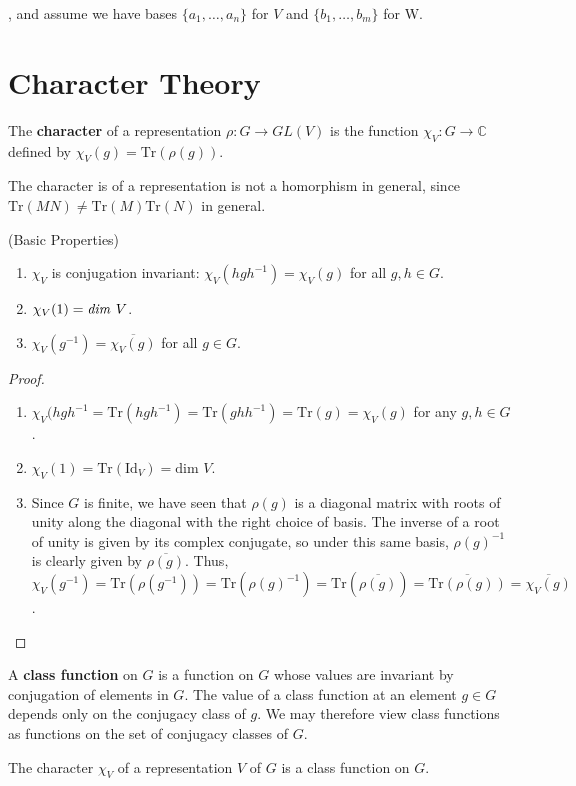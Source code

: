 , and assume we have bases $\{ a_1, \ldots, a_n\}$ for $V$  and $\{b_1, \ldots, b_m \}$ for W.


\section{Character Theory}
\begin{defn}
The \textbf{character} of a representation $\rho \colon G \to GL(V)$ is the function $\chi_V \colon G \to \mathbb{C}$ defined by $\chi_V(g) = \text{Tr}(\rho(g))$.
\end{defn}
\begin{note}
The character is of a representation is not a homorphism in general, since $\text{Tr}(MN) \neq \text{Tr}(M) \text{Tr}(N)$ in general.
\end{note}

\begin{prop} (Basic Properties)
\begin{enumerate}
\item $\chi_V$ is conjugation invariant: $\chi_V (h g h^{-1}) = \chi_V (g)$ for all $g , h \in G$.
\item $\chi_V (1) = \text{\emph{dim }} V$.
\item $\chi_V (g^{-1}) = \overline{\chi_V (g)}$ for all $g \in G$.
\end{enumerate}
\end{prop}

\begin{proof}
\begin{enumerate}
\item $\chi_V (h g h^{-1} = \text{Tr}(h g h^{-1}) = \text{Tr}(g h h^{-1}) = \text{Tr} (g) = \chi_V(g)$ for any $g,h \in G$.
\item $\chi_V(1) = \text{Tr}(\text{Id} _V) = \text{dim } V$.
\item Since $G$ is finite, we have seen that $\rho(g)$ is a diagonal matrix with roots of unity along the diagonal with the right choice of basis.  The inverse of a root of unity is given by its complex conjugate, so under this same basis, $\rho(g)^{-1}$ is clearly given by $\overline{\rho(g)}$.  Thus, $\chi_V(g^{-1}) = \text{Tr}(\rho(g^{-1})) = \text{Tr}(\rho(g)^{-1}) = \text{Tr}(\overline{\rho(g)}) = \overline{ \text{Tr} (\rho(g))} = \overline {\chi_V(g)}$.
\end{enumerate}
\end{proof}

\begin{defn}
A \textbf{class function} on $G$ is a function on $G$ whose values are invariant by conjugation of elements in $G$.  The value of a class function at an element $g \in G$ depends only on the conjugacy class of $g$.  We may therefore view class functions as functions on the set of conjugacy classes of $G$.
\end{defn}
\begin{note}
The character $\chi_V$ of a representation $V$ of $G$ is a class function on $G$.
\end{note}

